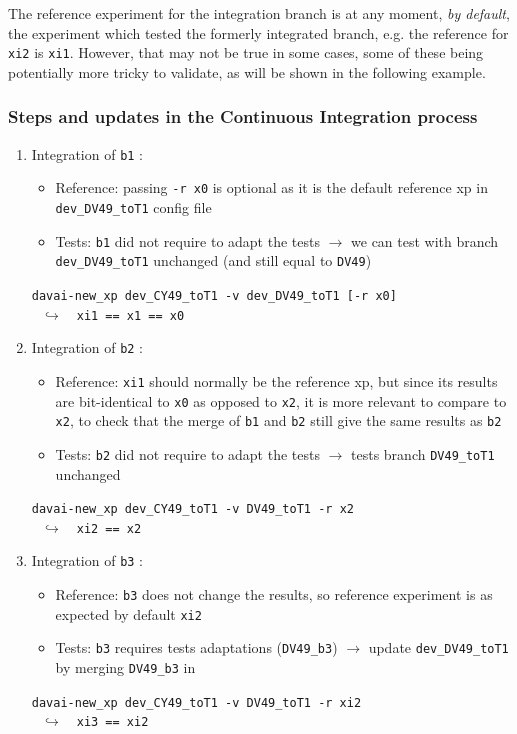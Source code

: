 \documentclass[a4paper,10pt,twoside]{article}
\begin{document}
\begin{appendix}
The reference experiment for the integration branch is at any moment, \textit{by default}, the experiment which tested the formerly integrated branch, e.g. the reference for \texttt{xi2} is \texttt{xi1}. However, that may not be true in some cases, some of these being potentially more tricky to validate, as will be shown in the following example.

\subsubsection{Steps and updates in the Continuous Integration process}
\begin{enumerate}[label=(\arabic*)]
 \item Integration of \texttt{b1} :
 \begin{itemize}
  \item Reference: passing \texttt{-r x0} is optional as it is the default reference xp in \texttt{dev\_DV49\_toT1} config file
  \item Tests: \texttt{b1} did not require to adapt the tests $\rightarrow$ we can test with branch \texttt{dev\_DV49\_toT1} unchanged (and still equal to \texttt{DV49})
 \end{itemize}
 \texttt{davai-new\_xp dev\_CY49\_toT1 -v dev\_DV49\_toT1 [-r x0]}\\
 $~~~\hookrightarrow~~~$ \texttt{xi1 == x1 == x0}

 \item Integration of \texttt{b2} :
 \begin{itemize}
  \item Reference: \texttt{xi1} should normally be the reference xp, but since its results are bit-identical to \texttt{x0} as opposed to \texttt{x2}, it is more relevant to compare to \texttt{x2}, to check that the merge of \texttt{b1} and \texttt{b2} still give the same results as \texttt{b2}
  \item Tests: \texttt{b2} did not require to adapt the tests $\rightarrow$ tests branch \texttt{DV49\_toT1} unchanged
 \end{itemize}
 \texttt{davai-new\_xp dev\_CY49\_toT1 -v DV49\_toT1 -r \texttt{x2}}\\
 $~~~\hookrightarrow~~~$ \texttt{xi2 == x2}

 \item Integration of \texttt{b3} :
 \begin{itemize}
  \item Reference: \texttt{b3} does not change the results, so reference experiment is as expected by default \texttt{xi2}
  \item Tests: \texttt{b3} requires tests adaptations (\texttt{DV49\_b3}) $\rightarrow$ update \texttt{dev\_DV49\_toT1} by merging \texttt{DV49\_b3} in
 \end{itemize}
 \texttt{davai-new\_xp dev\_CY49\_toT1 -v DV49\_toT1 -r xi2}\\
 $~~~\hookrightarrow~~~$ \texttt{xi3 == xi2}
 

\end{enumerate}
\end{appendix}
\end{document}
